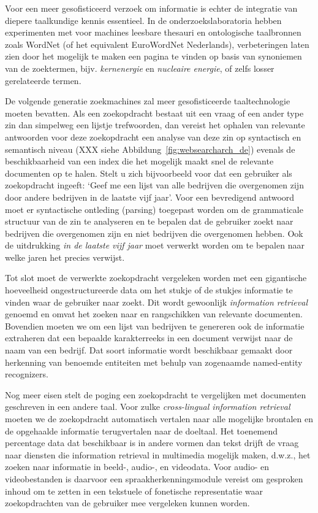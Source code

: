 \documentclass[]{../../metanetpaper}
\begin{document}
\begin{multicols}{2}
    Voor een meer gesofisticeerd verzoek om informatie is echter de integratie van diepere taalkundige kennis essentieel. In de onderzoekslaboratoria hebben experimenten met voor machines leesbare thesauri en ontologische taalbronnen zoals WordNet (of het equivalent EuroWordNet Nederlands), verbeteringen laten zien door het mogelijk te maken een pagina te vinden op basis van synoniemen van de zoektermen, bijv. \emph{kernenergie} en \emph{nucleaire energie}, of zelfs losser gerelateerde termen.

    De volgende generatie zoekmachines zal meer gesofisticeerde taaltechnologie moeten bevatten. Als een zoekopdracht bestaat uit een vraag of een ander type zin dan simpelweg een lijstje trefwoorden, dan vereist het ophalen van relevante antwoorden voor deze zoekopdracht een analyse van deze zin op syntactisch en semantisch niveau (XXX siehe Abbildung~\ref{fig:websearcharch_de}) evenals de beschikbaarheid van een index die het mogelijk maakt snel de relevante documenten op te halen. Stelt u zich bijvoorbeeld voor dat een gebruiker als zoekopdracht ingeeft: `Geef me een lijst van alle bedrijven die overgenomen zijn door andere bedrijven in de laatste vijf jaar'. Voor een bevredigend antwoord moet er syntactische ontleding (parsing) toegepast worden om de grammaticale structuur van de zin te analyseren en te bepalen dat de gebruiker zoekt naar bedrijven die overgenomen zijn en niet bedrijven die overgenomen hebben. Ook de uitdrukking \emph{in de laatste vijf jaar} moet verwerkt worden om te bepalen naar welke jaren het precies verwijst.

    Tot slot moet de verwerkte zoekopdracht vergeleken worden met een gigantische hoeveelheid ongestructureerde data om het stukje of de stukjes informatie te vinden waar de gebruiker naar zoekt. Dit wordt gewoonlijk \emph{information retrieval} genoemd en omvat het zoeken naar en rangschikken van relevante documenten. Bovendien moeten we om een lijst van bedrijven te genereren ook de informatie extraheren dat een bepaalde karakterreeks in een document verwijst naar de naam van een bedrijf. Dat soort informatie wordt beschikbaar gemaakt door herkenning van benoemde entiteiten met behulp van zogenaamde named-entity recognizers.

    Nog meer eisen stelt de poging een zoekopdracht te vergelijken met documenten geschreven in een andere taal. Voor zulke \emph{cross-lingual information retrieval} moeten we de zoekopdracht automatisch vertalen naar alle mogelijke brontalen en de opgehaalde informatie terugvertalen naar de doeltaal. Het toenemend percentage data dat beschikbaar is in andere vormen dan tekst drijft de vraag naar diensten die information retrieval in multimedia mogelijk maken, d.w.z., het zoeken naar informatie in beeld-, audio-, en videodata. Voor audio- en videobestanden is daarvoor een spraakherkenningsmodule vereist om gesproken inhoud om te zetten in een tekstuele of fonetische representatie waar zoekopdrachten van de gebruiker mee vergeleken kunnen worden.


\end{multicols}
\end{document}
